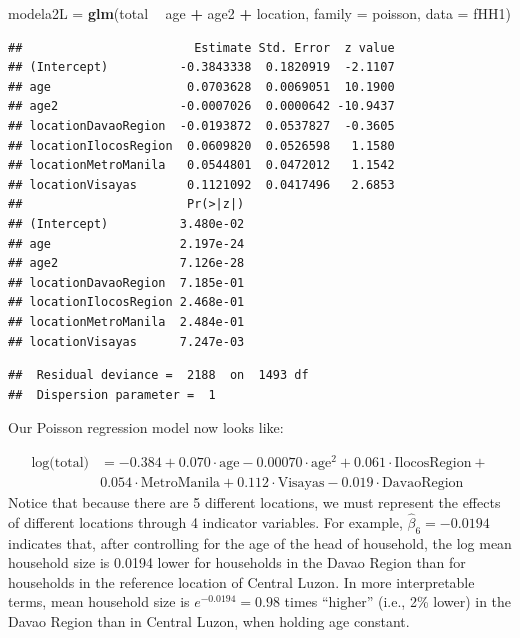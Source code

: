 \documentclass[
]{krantz}
\newenvironment{Shaded}{\begin{snugshade}}{\end{snugshade}}
\newcommand{\DataTypeTok}[1]{\textcolor[rgb]{0.27,0.27,0.27}{#1}}
\newcommand{\KeywordTok}[1]{\textcolor[rgb]{0.27,0.27,0.27}{\textbf{#1}}}
\newcommand{\NormalTok}[1]{#1}
\newcommand{\OperatorTok}[1]{\textcolor[rgb]{0.43,0.43,0.43}{\textbf{#1}}}
\newcommand{\StringTok}[1]{\textcolor[rgb]{0.5,0.5,0.5}{#1}}
\begin{document}
\begin{Shaded}
\begin{Highlighting}[]
\NormalTok{modela2L =}\StringTok{ }\KeywordTok{glm}\NormalTok{(total }\OperatorTok{~}\StringTok{ }\NormalTok{age }\OperatorTok{+}\StringTok{ }\NormalTok{age2 }\OperatorTok{+}\StringTok{ }\NormalTok{location, }
               \DataTypeTok{family =}\NormalTok{ poisson, }\DataTypeTok{data =}\NormalTok{ fHH1)}
\end{Highlighting}
\end{Shaded}

\begin{verbatim}
##                        Estimate Std. Error  z value
## (Intercept)          -0.3843338  0.1820919  -2.1107
## age                   0.0703628  0.0069051  10.1900
## age2                 -0.0007026  0.0000642 -10.9437
## locationDavaoRegion  -0.0193872  0.0537827  -0.3605
## locationIlocosRegion  0.0609820  0.0526598   1.1580
## locationMetroManila   0.0544801  0.0472012   1.1542
## locationVisayas       0.1121092  0.0417496   2.6853
##                       Pr(>|z|)
## (Intercept)          3.480e-02
## age                  2.197e-24
## age2                 7.126e-28
## locationDavaoRegion  7.185e-01
## locationIlocosRegion 2.468e-01
## locationMetroManila  2.484e-01
## locationVisayas      7.247e-03
\end{verbatim}

\begin{verbatim}
##  Residual deviance =  2188  on  1493 df 
##  Dispersion parameter =  1
\end{verbatim}

Our Poisson regression model now looks like:

\begin{align*}
\textrm{log(total)} & = -0.384 + 0.070 \cdot \textrm{age} - 0.00070 \cdot \textrm{age}^2 +0.061 \cdot \textrm{IlocosRegion} + \\ 
 & 0.054 \cdot\textrm{MetroManila}  +0.112 \cdot\textrm{Visayas} - 0.019 \cdot \textrm{DavaoRegion}
\end{align*}
Notice that because there are 5 different locations, we must represent the effects of different locations through 4 indicator variables. For example, \(\hat{\beta}_6=-0.0194\) indicates that, after controlling for the age of the head of household, the log mean household size is 0.0194 lower for households in the Davao Region than for households in the reference location of Central Luzon. In more interpretable terms, mean household size is \(e^{-0.0194}=0.98\) times ``higher'' (i.e., 2\% lower) in the Davao Region than in Central Luzon, when holding age constant.
\end{document}
